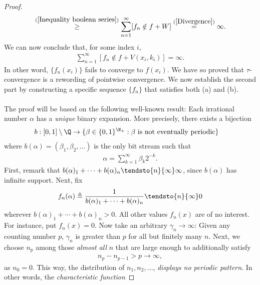 \begin{proof}
\begin{align}
      \overset{(\ref{Inequality boolean series})}{\geq}
  \sum_{n=1}^\infty [f_n \notin f + W]
    \overset{(\ref{Divergence})}{=}
  \infty .
\end{align}
%
We can now conclude that, for some index $i$, 
%
\begin{align}
  \sum_{n=1}^\infty [f_n \notin f + V(x_i, k_i)] = \infty .
\end{align}
%
In other word, $\{f_n(x_i)\}$ fails to converge to $f(x_i)$. We have so %
proved that $\tau$-convergence is a rewording of pointwise convergence. %
%
We now establish the second part by constructing a specific sequence %
$\{f_n\}$ that satisfies both (a) and (b). \\
\\
The proof will be based on the following well-known result: %
Each irrational number $\alpha$ has a \textit{unique} binary expansion. %
More precisely, there exists a bijection %
%
\begin{align}
  b: [0, 1] \setminus \Q &\to \{ 
      \beta \in \{0, 1\}^{\N_+}: \beta \text{ is not eventually periodic}
    \}
\end{align}
where %
%
  $b(\alpha) = (\beta_1, \beta_2, \dots)$ %
%
is the only bit stream such that %
%
\begin{align}
  \label{definition of alpha}
  \alpha = \sum_{k=1}^\infty \beta_k 2^{\minus k}.
\end{align}
%
First, remark that %
%
$b(\alpha)_1 + \dots + b(\alpha)_n \tendsto{n}{\infty}\infty$, %
%
since %
%
$b(\alpha)$
%
has infinite support. Next, fix %
%
\begin{equation}
  \label{definition of f_n(alpha)}
  f_n(\alpha)\triangleq %
  \frac{1}{b(\alpha)_1 + \cdots + b(\alpha)_n} \tendsto{n}{\infty} 0
\end{equation}
%
wherever $b(\alpha)_1+ \cdots + b(\alpha)_n > 0$. %
All other values $f_n(x)$ are of no interest. %
For instance, put $f_n(x) = 0$. %
%
Now take an arbitrary %
%
$\gamma_n \longrightarrow \infty$: %
%
Given any counting number $p$, $\gamma_n$ is greater than $p$ %
for all but finitely many $n$. %
%
Next, we choose $n_p$ among those \textit{almost all} $n$ that are 
large enough to additionally satisfy %
%
\begin{align}
  \label{definition of n_p}
  n_p - n_{p-1} > p \longrightarrow \infty, 
\end{align}
%
as $n_0=0$. This way, the distribution of %
%
  $n_1, n_2, \dots$, %
%
\textit{displays no periodic pattern}. %
In other words, the \textit{characteristic function} %

\end{proof}
